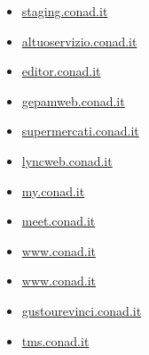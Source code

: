 \documentclass{article}
\begin{document}
\begin{itemize}
        \item \href{ http://staging.conad.it/ }{ staging.conad.it }
    
        
        
        \item \href{ https://altuoservizio.conad.it/login.html }{ altuoservizio.conad.it }
    
        
        
        \item \href{ https://editor.conad.it/libs/granite/core/content/login.html?resource=\%2F\&$$login$$=\%24\%24login\%24\%24\&j\_reason=unknown\&j\_reason\_code=unknown }{ editor.conad.it }
    
        
        
        \item \href{ http://gepamweb.conad.it }{ gepamweb.conad.it }
    
        
        
        \item \href{ http://supermercati.conad.it/ }{ supermercati.conad.it }
    
        
        
        \item \href{ https://lyncweb.conad.it/ }{ lyncweb.conad.it }
    
        
        
        \item \href{ https://my.conad.it/login }{ my.conad.it }
    
        
        
        \item \href{ https://meet.conad.it/ }{ meet.conad.it }
    
        
        
        \item \href{ https://www.conad.it/ }{ www.conad.it }
    
        
        
        \item \href{ https://www.conad.it/ricerca-negozi?utm\_source=crm\&utm\_medium=email\&utm\_content=124647515\&utm\_campaign=\_ }{ www.conad.it }
    
        
        
        \item \href{ http://gustourevinci.conad.it/vincitori2020/gustourevinci.htm }{ gustourevinci.conad.it }
    
        
        
        \item \href{ https://tms.conad.it/core/framework/login.cfm }{ tms.conad.it }
    

\end{itemize}
\end{document}
